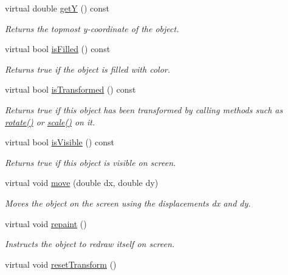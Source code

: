 \begin{DoxyCompactItemize}
virtual double \mbox{\hyperlink{classsgl_1_1GObject_aafa51c7f8f38a09febbb9ce7853f77b4}{getY}} () const
\begin{DoxyCompactList}\small\item\em Returns the topmost {\itshape y}-\/coordinate of the object. \end{DoxyCompactList}\item 
virtual bool \mbox{\hyperlink{classsgl_1_1GObject_a11c404f106940c201b6f326e0355c150}{is\+Filled}} () const
\begin{DoxyCompactList}\small\item\em Returns {\ttfamily true} if the object is filled with color. \end{DoxyCompactList}\item 
virtual bool \mbox{\hyperlink{classsgl_1_1GObject_a9de207581cfa4ca1eaa06da5f29b75fc}{is\+Transformed}} () const
\begin{DoxyCompactList}\small\item\em Returns {\ttfamily true} if this object has been transformed by calling methods such as \mbox{\hyperlink{classsgl_1_1GObject_ae1ffaa12185dfd5ba464f7d87c329e26}{rotate()}} or \mbox{\hyperlink{classsgl_1_1GObject_ad2e1900f730475c2d044817db03b38d6}{scale()}} on it. \end{DoxyCompactList}\item 
virtual bool \mbox{\hyperlink{classsgl_1_1GObject_a9d8a6cfb13917785c143e74d40e4e2be}{is\+Visible}} () const
\begin{DoxyCompactList}\small\item\em Returns {\ttfamily true} if this object is visible on screen. \end{DoxyCompactList}\item 
virtual void \mbox{\hyperlink{classsgl_1_1GObject_a5973d8dda83afb36e2c56855515be392}{move}} (double dx, double dy)
\begin{DoxyCompactList}\small\item\em Moves the object on the screen using the displacements {\ttfamily dx} and {\ttfamily dy}. \end{DoxyCompactList}\item 
virtual void \mbox{\hyperlink{classsgl_1_1GObject_ac827b978aa122f136a14c198687ad80f}{repaint}} ()
\begin{DoxyCompactList}\small\item\em Instructs the object to redraw itself on screen. \end{DoxyCompactList}\item 
virtual void \mbox{\hyperlink{classsgl_1_1GObject_a6022a1fd1e5dcd2fd5585e5a36aa3f37}{reset\+Transform}} ()

\end{DoxyCompactItemize}
